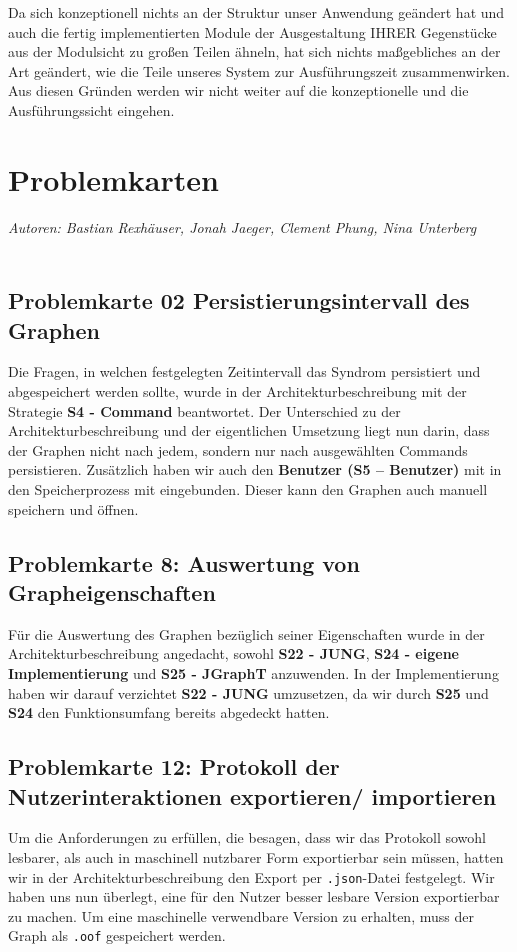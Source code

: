 \documentclass[enabledeprecatedfontcommands,fontsize=11pt,paper=a4,twoside]{scrartcl}
\newcounter{one}
\newcounter{two}[one]
\begin{document}
Da sich konzeptionell nichts an der Struktur unser Anwendung geändert hat und auch die fertig implementierten Module der Ausgestaltung IHRER Gegenstücke aus der Modulsicht zu großen Teilen ähneln, hat sich nichts maßgebliches an der Art geändert, wie die Teile unseres System zur Ausführungszeit zusammenwirken. Aus diesen Gründen werden wir nicht weiter auf die konzeptionelle und die Ausführungssicht eingehen. \\
\newpage

\section{Problemkarten}
\emph{Autoren: Bastian Rexhäuser, Jonah Jaeger, Clement Phung, Nina Unterberg}\\ \\

\subsection{Problemkarte 02 Persistierungsintervall des Graphen}
Die Fragen, in welchen festgelegten Zeitintervall das Syndrom persistiert und abgespeichert werden sollte, wurde in der Architekturbeschreibung mit der Strategie \textbf{S4 - Command} beantwortet. Der Unterschied zu der Architekturbeschreibung und der eigentlichen Umsetzung liegt nun darin, dass der Graphen nicht nach jedem, sondern nur nach ausgewählten Commands persistieren. Zusätzlich haben wir auch den \textbf{Benutzer (S5 – Benutzer)} mit in den Speicherprozess mit eingebunden. Dieser kann den Graphen auch manuell speichern und öffnen. \\

\subsection{Problemkarte 8: Auswertung von Grapheigenschaften}
Für die Auswertung des Graphen bezüglich seiner Eigenschaften wurde in der Architekturbeschreibung angedacht, sowohl \textbf{S22 - JUNG}, \textbf{S24 - eigene Implementierung} und \textbf{S25 - JGraphT} anzuwenden. In der Implementierung haben wir darauf verzichtet \textbf{S22 - JUNG} umzusetzen, da wir durch \textbf{S25} und \textbf{S24} den Funktionsumfang bereits abgedeckt hatten. \\

\subsection{Problemkarte 12: Protokoll der Nutzerinteraktionen exportieren/ importieren}
Um die Anforderungen zu erfüllen, die besagen, dass wir das Protokoll sowohl lesbarer, als auch in maschinell nutzbarer Form exportierbar sein müssen, hatten wir in der Architekturbeschreibung den Export per \texttt{.json}-Datei festgelegt. Wir haben uns nun überlegt, eine für den Nutzer besser lesbare Version exportierbar zu machen. Um eine maschinelle verwendbare Version zu erhalten, muss der Graph als \texttt{.oof} gespeichert werden.\\
\end{document}
